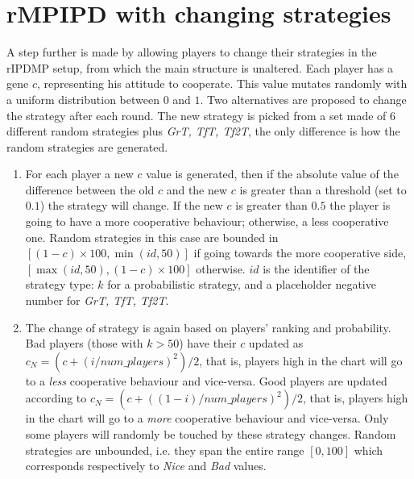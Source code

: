 \documentclass[journal,a4paper,10pt,twoside]{IEEEtran} %
\begin{document}
\section{rMPIPD with changing strategies} \label{s:crIPDMP}
A step further is made by allowing players to change their strategies in the rIPDMP setup, from which the main structure is unaltered.
Each player has a gene $c$, representing his attitude to cooperate. This value mutates randomly with a uniform distribution between $0$ and $1$.
Two alternatives are proposed to change the strategy after each round.
The new strategy is picked from a set made of $6$ different random strategies plus \textit{GrT, TfT, Tf2T}, the only difference is how the random strategies are generated.

\begin{enumerate}
    \item For each player a new $c$ value is generated, then if the absolute value of the difference between the old $c$ and the new $c$ is greater than a threshold (set to $0.1$) the strategy will change. If the new $c$ is greater than $0.5$ the player is going to have a more cooperative behaviour; otherwise, a less cooperative one.
	Random strategies in this case are bounded in 
	$[(1-c)\times 100, \min(id,50)]$ if going towards the more cooperative side, $[\max(id,50), (1-c)\times 100]$ otherwise. $id$ is the identifier of the strategy type: $k$ for a probabilistic strategy, and a placeholder negative number for \textit{GrT, TfT, Tf2T}.

	\item The change of strategy is again based on players' ranking and probability. Bad players (those with $k>50$) have their $c$ updated as
	$c_N = (c+(i/num\_players)^2)/2$, that is, players high in the chart will go to a \textit{less} cooperative behaviour and vice-versa.
	Good players are updated according to $c_N = (c+((1-i)/num\_players)^2)/2$, that is, players high in the chart will go to a \textit{more} cooperative behaviour and vice-versa.
	Only some players will randomly be touched by these strategy changes.
	Random strategies are unbounded, i.e. they span the entire range $[0,100]$ which corresponds respectively to \textit{Nice} and \textit{Bad} values.
\end{enumerate}
\end{document}
